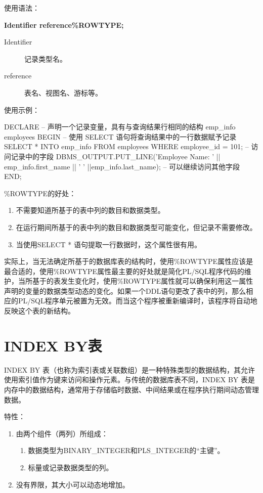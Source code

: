 \documentclass[11pt, a4paper, oneside, UTF8]{ctexbook}
\let\kaishu\relax %
\begin{document}
使用语法：

{\bfseries\kaishu Identifier reference\%ROWTYPE;}

\begin{description}
  \item[Identifier] 记录类型名。
  \item[reference] 表名、视图名、游标等。
\end{description}

使用示例：
\begin{plsql}[caption=\%ROWTYPE示例代码]
DECLARE
  -- 声明一个记录变量，具有与查询结果行相同的结构
  emp_info employees%
BEGIN
  -- 使用 SELECT 语句将查询结果中的一行数据赋予记录
  SELECT * INTO emp_info FROM employees WHERE employee_id = 101;
  -- 访问记录中的字段
  DBMS_OUTPUT.PUT_LINE('Employee Name: ' || emp_info.first_name || ' ' ||emp_info.last_name);
  -- 可以继续访问其他字段
END;
\end{plsql}

\%ROWTYPE的好处：
\begin{enumerate}
  \item 不需要知道所基于的表中列的数目和数据类型。
  \item 在运行期间所基于的表中列的数目和数据类型可能变化，但记录不需要修改。
  \item 当使用SELECT * 语句提取一行数据时，这个属性很有用。
\end{enumerate}

实际上，当无法确定所基于的数据库表的结构时，使用\%ROWTYPE属性应该是最合适的，使用\%ROWTYPE属性最主要的好处就是简化PL/SQL程序代码的维护，当所基于的表发生变化时，使用\%ROWTYPE属性就可以确保利用这一属性声明的变量的数据类型动态的变化。如果一个DDL语句更改了表中的列，那么相应的PL/SQL程序单元被置为无效。而当这个程序被重新编译时，该程序将自动地反映这个表的新结构。

\section{INDEX BY表}
INDEX BY 表（也称为索引表或关联数组）是一种特殊类型的数据结构，其允许使用索引值作为键来访问和操作元素。与传统的数据库表不同，INDEX BY 表是内存中的数据结构，通常用于存储临时数据、中间结果或在程序执行期间动态管理数据。

特性：
\begin{enumerate}
  \item 由两个组件（两列）所组成：
  \begin{enumerate}
    \item 数据类型为BINARY\_INTEGER和PLS\_INTEGER的“主键”。
    \item 标量或记录数据类型的列。
  \end{enumerate}
  \item 没有界限，其大小可以动态地增加。
\end{enumerate}
\end{document}
